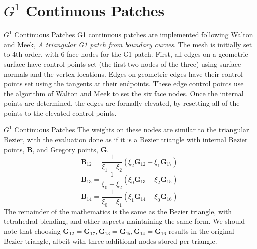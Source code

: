 \documentclass[12pt]{beamer}
\begin{document}
\section{$G^1$ Continuous Patches}
\begin{frame}{$G^1$ Continuous Patches}
G1 continuous patches are implemented following Walton and Meek, \textit{A triangular G1 patch from boundary curves}. The mesh is initially set to 4th order, with 6 face nodes for the G1 patch. First, all edges on a geometric surface have control points set (the first two nodes of the three) using surface normals and the vertex locations. Edges on geometric edges have their control points set using the tangents at their endpoints. These edge control points use the algorithm of Walton and Meek to set the six face nodes. Once the internal points are determined, the edges are formally elevated, by resetting all of the points to the elevated control points.
\end{frame}
\begin{frame}{$G^1$ Continuous Patches}
The weights on these nodes are similar to the triangular Bezier, with the evaluation done as if it is a Bezier triangle with internal Bezier points, $\mathbf{B}$, and Gregory points, $\mathbf{G}$.
\begin{equation}
\mathbf{B}_{12} = \frac{1}{\xi_1+\xi_2}(\xi_2\mathbf{G}_{12}+\xi_1\mathbf{G}_{17})
\end{equation}
\begin{equation}
\mathbf{B}_{13} = \frac{1}{\xi_0+\xi_2}(\xi_0\mathbf{G}_{13}+\xi_2\mathbf{G}_{15})
\end{equation}
\begin{equation}
\mathbf{B}_{14} = \frac{1}{\xi_0+\xi_1}(\xi_1\mathbf{G}_{14}+\xi_0\mathbf{G}_{16})
\end{equation}
The remainder of the mathematics is the same as the Bezier triangle, with tetrahedral blending, and other aspects maintaining the same form. We should note that choosing $\mathbf{G}_{12} = \mathbf{G}_{17}, \mathbf{G}_{13} = \mathbf{G}_{15}, \mathbf{G}_{14} = \mathbf{G}_{16}$ results in the original Bezier triangle, albeit with three additional nodes stored per triangle.
\end{frame}
\end{document}
